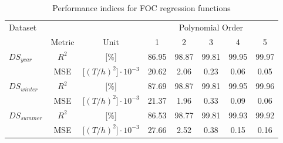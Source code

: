 \begin{table}[h]
    \footnotesize
    \centering
    {\begin{tabular}{ l c c c c c c c }
    \hline
    Dataset & &  & \multicolumn{5}{c}{Polynomial Order}\\
    & Metric & Unit & 1 & 2 & 3 & 4 & 5 \\
    \hline
    $DS_{year}$ & $R^2$ & [$\%$] & 86.95 & 98.87 & 99.81 & 99.95 & 99.97 \\
    &MSE & [$(T/h)^2] \cdot 10^{-3}$ & 20.62 & 2.06 & 0.23 & 0.06 & 0.05 \\   
    $DS_{winter}$ & $R^2$ & [$\%$] & 87.69 & 98.87 & 99.81 & 99.95 & 99.96 \\
    &MSE & [$(T/h)^2] \cdot 10^{-3}$ & 21.37 & 1.96 & 0.33 & 0.09 & 0.06\\
    $DS_{summer}$ & $R^2$ & [$\%$] & 86.53 & 98.77 & 99.81 & 99.93 & 99.92\\
    &MSE & [$(T/h)^2] \cdot 10^{-3}$ & 27.66 & 2.52 & 0.38 & 0.15 & 0.16\\

    \hline
    \end{tabular}}
\caption{Performance indices for FOC regression functions}\label{tbl:polyfit_scores_errors}
\end{table}

